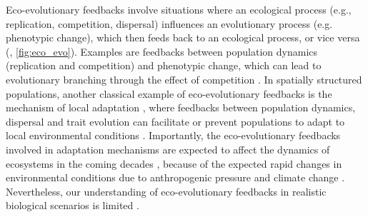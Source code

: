 % 
Eco-evolutionary feedbacks involve situations where an ecological process (e.g., replication, competition, dispersal) influences an evolutionary process (e.g. phenotypic change), which then feeds back to an ecological process, or vice versa (\cite{Govaert2019}, \cref{fig:eco_evo}). Examples are feedbacks between population dynamics (replication and competition) and phenotypic change, which can lead to evolutionary branching through the effect of competition \citep{Dieckmann1999}.
% 
In spatially structured populations, another classical example of eco-evolutionary feedbacks is the mechanism of local adaptation \citep{Savolainen2007}, where feedbacks between population dynamics, dispersal and trait evolution can facilitate or prevent populations to adapt to local environmental conditions \citep{Meszena1997,Doebeli2003}.
% 
Importantly, the eco-evolutionary feedbacks involved in adaptation mechanisms are expected to affect the dynamics of ecosystems in the coming decades \citep{Norberg2012,Urban2016}, because of the expected rapid changes in environmental conditions due to anthropogenic pressure and climate change \citep{Ellis2011,Midgley2019}.
% 
Nevertheless, our understanding of eco-evolutionary feedbacks in realistic biological scenarios is limited \citep{Lion2022}.
% 
% 
% 
% 

